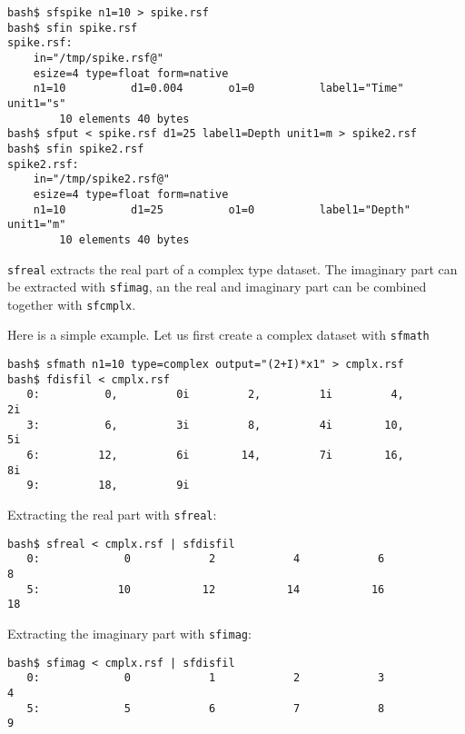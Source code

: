 \begin{verbatim}
bash$ sfspike n1=10 > spike.rsf
bash$ sfin spike.rsf
spike.rsf:
    in="/tmp/spike.rsf@"
    esize=4 type=float form=native
    n1=10          d1=0.004       o1=0          label1="Time" unit1="s"
        10 elements 40 bytes
bash$ sfput < spike.rsf d1=25 label1=Depth unit1=m > spike2.rsf
bash$ sfin spike2.rsf
spike2.rsf:
    in="/tmp/spike2.rsf@"
    esize=4 type=float form=native
    n1=10          d1=25          o1=0          label1="Depth" unit1="m"
        10 elements 40 bytes
\end{verbatim}

\noindent\doublebox{\parbox{\textwidth}{
    
  }}

\texttt{sfreal} extracts the real part of a complex type dataset. The
imaginary part can be extracted with \texttt{sfimag}, an the real
and imaginary part can be combined together with \texttt{sfcmplx}.


Here is a simple example. Let us first create a complex dataset 
with \texttt{sfmath}
\begin{verbatim}
bash$ sfmath n1=10 type=complex output="(2+I)*x1" > cmplx.rsf
bash$ fdisfil < cmplx.rsf
   0:          0,         0i         2,         1i         4,         2i
   3:          6,         3i         8,         4i        10,         5i
   6:         12,         6i        14,         7i        16,         8i
   9:         18,         9i
\end{verbatim}
Extracting the real part with \texttt{sfreal}:
\begin{verbatim}
bash$ sfreal < cmplx.rsf | sfdisfil
   0:             0            2            4            6            8
   5:            10           12           14           16           18
\end{verbatim}
Extracting the imaginary part with \texttt{sfimag}:
\begin{verbatim}
bash$ sfimag < cmplx.rsf | sfdisfil
   0:             0            1            2            3            4
   5:             5            6            7            8            9
\end{verbatim}

\noindent\doublebox{\parbox{\textwidth}{
    
  }}

